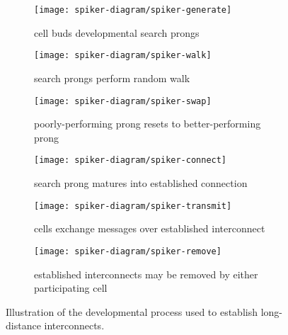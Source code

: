 \begin{figure}[!htbp]
\begin{center}
\begin{subfigure}[b]{0.45\linewidth}
  \texttt{[image: spiker-diagram/spiker-generate]}
  \caption{cell buds developmental search prongs}
  \label{fig:budprongs}
\end{subfigure}
\begin{subfigure}[b]{0.45\linewidth}
  \texttt{[image: spiker-diagram/spiker-walk]}
  \caption{search prongs perform random walk}
  \label{fig:randomwalk}
\end{subfigure}
\begin{subfigure}[b]{0.45\linewidth}
  \texttt{[image: spiker-diagram/spiker-swap]}
  \caption{poorly-performing prong resets to better-performing prong}
  \label{fig:prongreset}
\end{subfigure}
\begin{subfigure}[b]{0.45\linewidth}
  \texttt{[image: spiker-diagram/spiker-connect]}
  \caption{search prong matures into established connection}
  \label{fig:pringmature}
\end{subfigure}
\begin{subfigure}[b]{0.45\linewidth}
  \texttt{[image: spiker-diagram/spiker-transmit]}
  \caption{cells exchange messages over established interconnect}
  \label{fig:interconnectexchange}
\end{subfigure}
\begin{subfigure}[b]{0.45\linewidth}
  \texttt{[image: spiker-diagram/spiker-remove]}
  \caption{established interconnects may be removed by either participating cell}
  \label{fig:interconnectremove}
\end{subfigure}
\caption{
Illustration of the developmental process used to establish long-distance interconnects.
}
\label{fig:spiker_diagram}
\end{center}
\end{figure}
